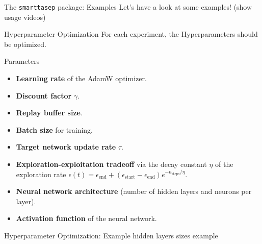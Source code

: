 \documentclass[10pt,xcolor=table, aspectratio=1610]{beamer}
\begin{document}
\begin{frame}{The \texttt{smarttasep} package: Examples}
Let's have a look at some examples! (show usage videos)
\end{frame}

\begin{frame}{Hyperparameter Optimization}
  For each experiment, the Hyperparameters should be optimized. 
    \begin{block}{Parameters}
      \begin{itemize}
        \item \textbf{Learning rate} of the AdamW optimizer.
        \item \textbf{Discount factor} $\gamma$.
        \item \textbf{Replay buffer size}.
        \item \textbf{Batch size} for training.
        \item \textbf{Target network update rate} $\tau$.
        \item \textbf{Exploration-exploitation tradeoff} via the decay constant $\eta$ of the exploration rate $\epsilon(t)=\epsilon_{\text{end}} + (\epsilon_{\text{start}} - \epsilon_{\text{end}}) e^{-n_{\text{steps}}/\eta}$.
        \item \textbf{Neural network architecture} (number of hidden layers and neurons per layer).
        \item \textbf{Activation function} of the neural network.
    \end{itemize}
    \end{block}
\end{frame}

\begin{frame}{Hyperparameter Optimization: Example}
    hidden layers sizes example
\end{frame}
\end{document}
